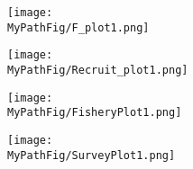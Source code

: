 \documentclass[]{report}
\begin{document}

\raggedright

\noindent
\normalsize{
	\textit{				
		\PreAmb{}
	}
}
\medskip

\normalsize{
	\SoS{}
}
\medskip

	
\medskip

\large{
	
}
\medskip

\normalsize{
	\Proj{}
}
\medskip

\large{
	
}
\medskip

\normalsize{
	\SpecCmt{}
}
\bigskip

\normalsize{
	\Refr{}
}
	\clearpage


\begin{figure}
	\centering	
	\captionsetup{singlelinecheck=off}
	\caption[.]{\figSSBCap{}}
	\label{SSB_plot1}
\end{figure}
\clearpage 

\begin{figure}
	\centering	
	\texttt{[image: \\MyPathFig/F\_plot1.png]}
	\captionsetup{singlelinecheck=off}
	\caption[.]{\figFCap{}}
	\label{F_plot1}
\end{figure}
\clearpage

\begin{figure}
	\centering	
	\texttt{[image: \\MyPathFig/Recruit\_plot1.png]}
	\captionsetup{singlelinecheck=off}
	\caption[.]{\figRecrCap{}}
	\label{Recr_plot1}
\end{figure}
\clearpage

\begin{figure}
	\centering	
	\texttt{[image: \\MyPathFig/FisheryPlot1.png]}
	\captionsetup{singlelinecheck=off}
	\caption[.]{\figFishCap{}}
	\label{Fish_plot1}
\end{figure}
\clearpage 

\begin{figure}
	\centering	
	\texttt{[image: \\MyPathFig/SurveyPlot1.png]}
	\captionsetup{singlelinecheck=off}
	\caption[.]{\figSurvCap{}}
	\label{Surv_plot1}
\end{figure}
\clearpage 
\end{document}
